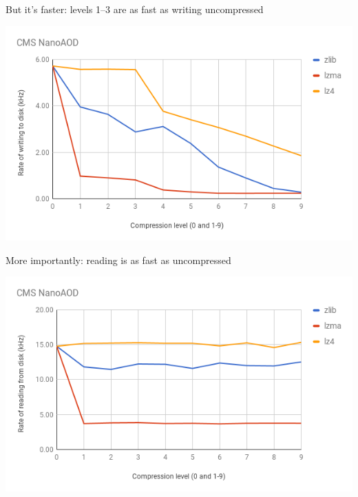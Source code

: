 \documentclass[aspectratio=169]{beamer}
\begin{document}
\begin{frame}{But it's faster: levels 1--3 are as fast as writing uncompressed}
\vspace{0.1 cm}
\begin{center}
\includegraphics[width=0.9\linewidth]{write-vs-compression.png}
\end{center}
\end{frame}

\begin{frame}{More importantly: reading is as fast as uncompressed}
\vspace{0.1 cm}
\begin{center}
\includegraphics[width=0.9\linewidth]{read-vs-compression.png}
\end{center}
\end{frame}
\end{document}
